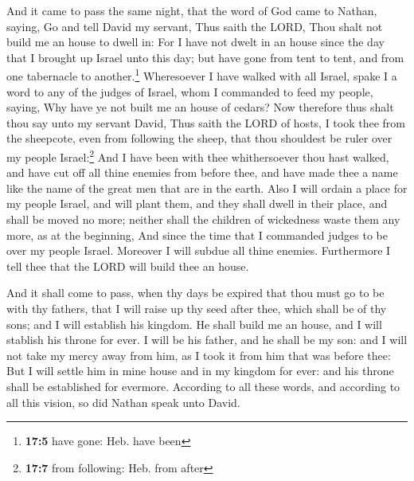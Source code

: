  And it came to pass the same night, that the word of God
came to Nathan, saying,  Go and tell David my servant,
Thus saith the LORD, Thou shalt not build me an house to dwell in:
 For I have not dwelt in an house since the day that I
brought up Israel unto this day; but have gone from tent to tent, and
from one tabernacle to another.\footnote{\textbf{17:5} have gone: Heb.
  have been}  Wheresoever I have walked with all Israel,
spake I a word to any of the judges of Israel, whom I commanded to feed
my people, saying, Why have ye not built me an house of cedars?
 Now therefore thus shalt thou say unto my servant David,
Thus saith the LORD of hosts, I took thee from the sheepcote, even from
following the sheep, that thou shouldest be ruler over my people
Israel:\footnote{\textbf{17:7} from following: Heb. from after}
 And I have been with thee whithersoever thou hast walked,
and have cut off all thine enemies from before thee, and have made thee
a name like the name of the great men that are in the earth.
 Also I will ordain a place for my people Israel, and will
plant them, and they shall dwell in their place, and shall be moved no
more; neither shall the children of wickedness waste them any more, as
at the beginning,  And since the time that I commanded
judges to be over my people Israel. Moreover I will subdue all thine
enemies. Furthermore I tell thee that the LORD will build thee an house.

 And it shall come to pass, when thy days be expired that
thou must go to be with thy fathers, that I will raise up thy seed after
thee, which shall be of thy sons; and I will establish his kingdom.
 He shall build me an house, and I will stablish his
throne for ever.  I will be his father, and he shall be
my son: and I will not take my mercy away from him, as I took it from
him that was before thee:  But I will settle him in mine
house and in my kingdom for ever: and his throne shall be established
for evermore.  According to all these words, and
according to all this vision, so did Nathan speak unto David.

